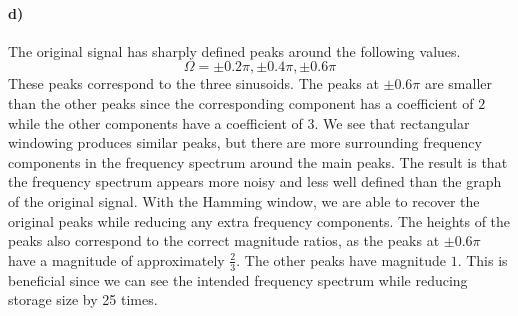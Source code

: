 \documentclass[12pt]{article}
\begin{document}
\paragraph{d)}

The original signal has sharply defined peaks around the following values.
\[\Omega=\pm0.2\pi, \pm0.4\pi, \pm0.6\pi\]
These peaks correspond to the three sinusoids. The peaks at \(\pm0.6\pi\) are smaller than the other peaks since
the corresponding component has a coefficient of \(2\) while the other components have a coefficient of \(3\). We see
that rectangular windowing produces similar peaks, but there are more surrounding frequency components in the frequency spectrum
around the main peaks. The result is that the frequency spectrum appears more noisy and less well defined than the graph of the
original signal. With the Hamming window, we are able to recover the original peaks while reducing any extra frequency components.
The heights of the peaks also correspond to the correct magnitude ratios, as the peaks at \(\pm0.6\pi\) have a magnitude of
approximately \(\frac{2}{3}\). The other peaks have magnitude \(1\). This is beneficial since we can see the intended frequency
spectrum while reducing storage size by 25 times.
\end{document}

